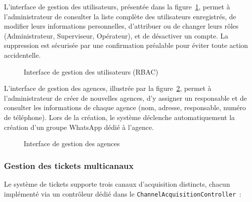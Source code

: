 L'interface de gestion des utilisateurs, pr\'{e}sent\'{e}e dans la figure~\ref{fig:users}, permet \`{a} l'administrateur de consulter la liste compl\`{e}te des utilisateurs enregistr\'{e}s, de modifier leurs informations personnelles, d'attribuer ou de changer leurs r\^{o}les (Administrateur, Superviseur, Op\'{e}rateur), et de d\'{e}sactiver un compte. La suppression est s\'{e}curis\'{e}e par une confirmation pr\'{e}alable pour \'{e}viter toute action accidentelle.

\begin{figure}[H]
    \centering
    \caption{Interface de gestion des utilisateurs (RBAC)}
    \label{fig:users}
\end{figure}

L'interface de gestion des agences, illustr\'{e}e par la figure~\ref{fig:agences}, permet \`{a} l'administrateur de cr\'{e}er de nouvelles agences, d'y assigner un responsable et de consulter les informations de chaque agence (nom, adresse, responsable, num\'{e}ro de t\'{e}l\'{e}phone). Lors de la cr\'{e}ation, le syst\`{e}me d\'{e}clenche automatiquement la cr\'{e}ation d'un groupe WhatsApp d\'{e}di\'{e} \`{a} l'agence.

\begin{figure}[H]
    \centering
    \caption{Interface de gestion des agences}
    \label{fig:agences}
\end{figure}

\subsubsection{Gestion des tickets multicanaux}

Le syst\`{e}me de tickets supporte trois canaux d'acquisition distincts, chacun impl\'{e}ment\'{e} via un contr\^{o}leur d\'{e}di\'{e} dans le \texttt{ChannelAcquisitionController}~:

